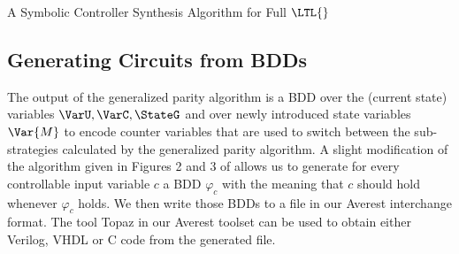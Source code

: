 \documentclass[copyright,creativecommons]{eptcs}
\begin{document}
\begin{section}{A Symbolic Controller Synthesis Algorithm for Full $\LTL{}$}
\subsection{Generating Circuits from BDDs}
The output of the generalized parity algorithm is a BDD over the (current state) variables $\VarU,\VarC,\StateG$ and over newly introduced state variables $\Var{M}$ to encode counter variables that are used to switch between the sub-strategies calculated by the generalized parity algorithm. A slight modification of the algorithm given in Figures 2 and 3 of \cite{BGJP07a} allows us to generate for every controllable input variable $c$ a BDD $\varphi_c$ with the meaning that $c$ should hold whenever $\varphi_c$ holds. We then write those BDDs to a file in our Averest interchange format. The tool Topaz in our Averest toolset can be used to obtain either Verilog, VHDL or C code from the generated file.

\end{section}
\end{document}

